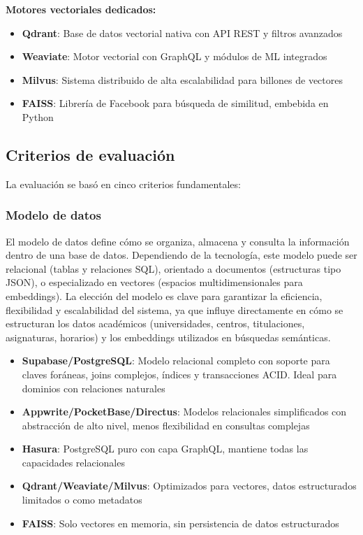 \textbf{Motores vectoriales dedicados:}
\begin{itemize}
    \item \textbf{Qdrant}: Base de datos vectorial nativa con API REST y filtros avanzados
    \item \textbf{Weaviate}: Motor vectorial con GraphQL y módulos de ML integrados
    \item \textbf{Milvus}: Sistema distribuido de alta escalabilidad para billones de vectores
    \item \textbf{FAISS}: Librería de Facebook para búsqueda de similitud, embebida en Python
\end{itemize}

\subsection{Criterios de evaluación}\label{subsec:criterios-evaluacion-bd}

La evaluación se basó en cinco criterios fundamentales:

\subsubsection{Modelo de datos}

El modelo de datos define cómo se organiza, almacena y consulta la información dentro de una base de datos. Dependiendo de la tecnología, este modelo puede ser relacional (tablas y relaciones SQL), orientado a documentos (estructuras tipo JSON), o especializado en vectores (espacios multidimensionales para embeddings). La elección del modelo es clave para garantizar la eficiencia, flexibilidad y escalabilidad del sistema, ya que influye directamente en cómo se estructuran los datos académicos (universidades, centros, titulaciones, asignaturas, horarios) y los embeddings utilizados en búsquedas semánticas.

\begin{itemize}
    \item \textbf{Supabase/PostgreSQL}: Modelo relacional completo con soporte para claves foráneas, joins complejos, índices y transacciones ACID. Ideal para dominios con relaciones naturales
    \item \textbf{Appwrite/PocketBase/Directus}: Modelos relacionales simplificados con abstracción de alto nivel, menos flexibilidad en consultas complejas
    \item \textbf{Hasura}: PostgreSQL puro con capa GraphQL, mantiene todas las capacidades relacionales
    \item \textbf{Qdrant/Weaviate/Milvus}: Optimizados para vectores, datos estructurados limitados o como metadatos
    \item \textbf{FAISS}: Solo vectores en memoria, sin persistencia de datos estructurados
\end{itemize}

